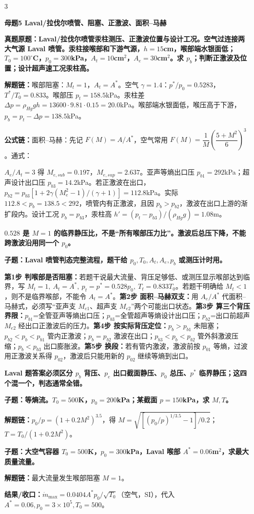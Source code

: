\documentclass[a4paper]{article}
\newcommand{\mt}[1]{\vspace{0.45pt}\colorbox{M}{\parbox{\dimexpr\linewidth-2\fboxsep}{\color{white}\bfseries #1}}\par}
\newcommand{\qt}[1]{\vspace{0.25pt}\colorbox{Q}{\parbox{\dimexpr\linewidth-2\fboxsep}{\color{white}\bfseries #1}}\par}
\newcommand{\ans}[1]{\colorbox{G}{\parbox{\dimexpr\linewidth-2\fboxsep}{#1}}\par}
\newcommand{\warn}[1]{\colorbox{Y}{\parbox{\dimexpr\linewidth-2\fboxsep}{\color{E}\bfseries #1}}\par}
\newcommand{\chain}[1]{{\color{A}\bfseries 解题链：}#1\par}
\newcommand{\res}[1]{{\color{E}\bfseries 结果/收口：}#1\par}
\newcommand{\form}[1]{{\color{M}\bfseries 公式链：}#1\par}
\newenvironment{vfourWrap}{\par\begingroup\fontsize{2.68}{2.84}\selectfont\setlength{\fboxsep}{0.45pt}}{\par\endgroup}
\begin{document}
\begin{multicols}{3}
\begin{vfourWrap}
\end{vfourWrap}
\mt{母题5 Laval/拉伐尔喷管、阻塞、正激波、面积--马赫}
\qt{真题原题：Laval/拉伐尔喷管汞柱测压、正激波位置与设计工况。空气过连接两大气源 Laval 喷管。汞柱接喉部和下游气源，$h=15$cm，喉部端水银面低；$T_0=100^\circ$C，$p_0=300$kPa，$A_t=10$cm$^2$，$A_e=30$cm$^2$。求 $p_b$；判断正激波及位置；设计超声速工况汞柱高。}
\chain{喉部阻塞：$M_t=1$，$A_t=A^*$。空气 $\gamma=1.4$：$p^*/p_0=0.5283$，$T^*/T_0=0.833$。喉部压 $p_t=158.5$kPa。汞柱差 $\Delta p=\rho_{Hg}gh=13600\cdot9.81\cdot0.15=20.0$kPa。喉部端水银面低，喉压高于下游，$p_b=p_t-\Delta p=138.5$kPa。}
\form{面积--马赫：先记 $F(M)=A/A^*$，空气常用 $F(M)=\dfrac1M\left(\dfrac{5+M^2}{6}\right)^3$。通式：}
\ans{\resizebox{0.94\linewidth}{!}{$\displaystyle F(M)=\frac{A}{A^*}=\frac1M\left[\frac{2}{\gamma+1}\left(1+\frac{\gamma-1}{2}M^2\right)\right]^{\frac{\gamma+1}{2(\gamma-1)}}$}}
\ans{$A_e/A_t=3$ 得 $M_{e,sub}=0.197$，$M_{e,sup}=2.637$。亚声等熵出口压 $p_{b1}=292$kPa；超声设计出口压 $p_{b3}=14.2$kPa。若正激波在出口，$p_{b2}=p_{b3}[1+2\gamma(M_e^2-1)/(\gamma+1)]=112.8$kPa。实际 $112.8<p_b=138.5<292$，喷管内有正激波，且因 $p_b>p_{b2}$，激波在出口上游的渐扩段内。设计工况 $p_b=p_{b3}$，汞柱高 $h'=(p_t-p_{b3})/(\rho_{Hg}g)=1.08$m。}
\warn{$0.528$ 是 $M=1$ 的临界静压比，不是“所有喉部压力比”。激波后总压下降，不能跨激波沿用同一个 $p_0$。}

\qt{子题：Laval 喷管判态完整流程，题干给 $p_0,T_0,A_t,A_e,p_b$ 或测压计时用。}
\ans{\textbf{第1步 判喉部是否阻塞：}若题干说最大流量、背压足够低、或测压显示喉部达到临界，写 $M_t=1,\ A_t=A^*,\ p_t=p^*=0.528p_0,\ T_t=0.833T_0$。若题干明确给 $M_t<1$，则不是临界喉部，不能令 $A_t=A^*$。\textbf{第2步 面积--马赫双支：}用 $A_e/A^*$ 代面积--马赫式，必须写“亚声支 $M_{e1}$、超声支 $M_{e2}$”两个可能出口状态。\textbf{第3步 算三个背压界限：}$p_{b1}$=全管亚声等熵出口压；$p_{b3}$=全管超声等熵设计出口压；$p_{b2}$=出口前超声 $M_{e2}$ 经出口正激波后的压力。\textbf{第4步 按实际背压定位：}$p_b>p_{b1}$ 未阻塞；$p_{b2}<p_b<p_{b1}$ 管内正激波；$p_b=p_{b2}$ 激波在出口；$p_{b3}<p_b<p_{b2}$ 管外斜激波压缩；$p_b<p_{b3}$ 出口膨胀波。\textbf{第5步 换段：}若有管内激波，激波前按 $p_{01}$ 等熵，过波用正激波关系得 $p_{02}$，激波后只能用新的 $p_{02}$ 继续等熵到出口。}
\warn{Laval 题答案必须区分 $p_b$ 背压、$p_e$ 出口截面静压、$p_0$ 总压、$p^*$ 临界静压；这四个混一个，判态通常全错。}

\qt{子题：等熵流。$T_0=500$K，$p_0=200$kPa；某截面 $p=150$kPa，求 $M,T$。}
\chain{$p_0/p=(1+0.2M^2)^{3.5}$，得 $M=\sqrt{[(p_0/p)^{1/3.5}-1]/0.2}$；$T=T_0/(1+0.2M^2)$。}

\qt{子题：大空气容器 $T_0=500$K，$p_0=300$kPa，Laval 喉部 $A^*=0.06$m$^2$，求最大质量流量。}
\chain{最大流量发生喉部阻塞 $M=1$。}
\res{$\dot m_{\max}=0.0404 A^*p_0/\sqrt{T_0}$（空气，SI），代入 $A^*=0.06,p_0=3\times10^5,T_0=500$。}


\end{multicols}
\end{document}
